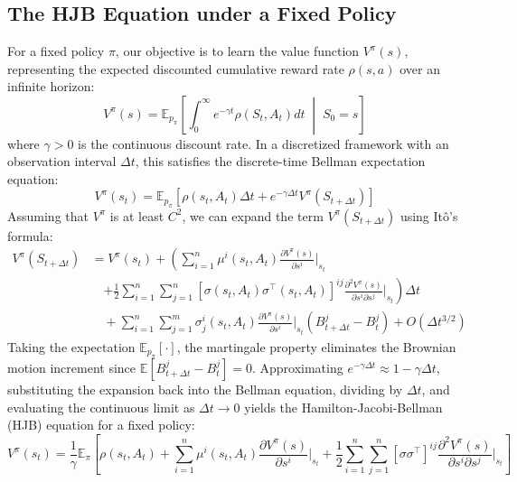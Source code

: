 \documentclass{article}
\begin{document}
\subsection{The HJB Equation under a Fixed Policy}
For a fixed policy $\pi$, our objective is to learn the value function $V^\pi(s)$, representing the expected discounted cumulative reward rate $\rho(s, a)$ over an infinite horizon:
\begin{equation}
    V^\pi(s) = \mathbb{E}_{p_\pi} \left[ \int_0^\infty e^{-\gamma t} \rho(S_t, A_t) dt \;\middle|\; S_0 = s \right]
\end{equation}
where $\gamma > 0$ is the continuous discount rate. In a discretized framework with an observation interval $\Delta t$, this satisfies the discrete-time Bellman expectation equation:
\begin{equation}
    V^\pi(s_t) = \mathbb{E}_{p_\pi} \left[ \rho(s_t, A_t)\Delta t + e^{-\gamma \Delta t} V^\pi(S_{t+\Delta t}) \right]
\end{equation}
Assuming that $V^\pi$ is at least $C^2$, we can expand the term $V^\pi(S_{t+\Delta t})$ using It\^o's formula:
\begin{align}
    V^\pi(S_{t+\Delta t}) &= V^\pi(s_t) + \left( \sum_{i=1}^n \mu^i(s_t, A_t) \frac{\partial V^\pi(s)}{\partial s^i}\Big|_{s_t} \right.\nonumber\\
    &\quad \left. + \frac{1}{2} \sum_{i=1}^n \sum_{j=1}^n \left[\sigma(s_t, A_t)\sigma^\top(s_t, A_t)\right]^{ij} \frac{\partial^2 V^\pi(s)}{\partial s^i \partial s^j}\Big|_{s_t} \right) \Delta t \nonumber\\
    &\quad + \sum_{i=1}^n \sum_{j=1}^m \sigma_j^i(s_t, A_t)\frac{\partial V^\pi(s)}{\partial s^i}\Big|_{s_t} (B^j_{t+\Delta t} - B^j_t) + O(\Delta t^{3/2})
\end{align}
Taking the expectation $\mathbb{E}_{p_\pi}[\cdot]$, the martingale property eliminates the Brownian motion increment since $\mathbb{E}[B^j_{t+\Delta t} - B^j_t] = 0$. Approximating $e^{-\gamma \Delta t} \approx 1 - \gamma \Delta t$, substituting the expansion back into the Bellman equation, dividing by $\Delta t$, and evaluating the continuous limit as $\Delta t \to 0$ yields the Hamilton-Jacobi-Bellman (HJB) equation for a fixed policy:
\begin{equation}
    V^\pi(s_t) = \frac{1}{\gamma} \mathbb{E}_{\pi} \left[ \rho(s_t, A_t) + \sum_{i=1}^n \mu^i(s_t, A_t) \frac{\partial V^\pi(s)}{\partial s^i}\Big|_{s_t} + \frac{1}{2} \sum_{i=1}^n \sum_{j=1}^n [\sigma\sigma^\top]^{ij} \frac{\partial^2 V^\pi(s)}{\partial s^i \partial s^j}\Big|_{s_t} \right]
\end{equation}
\end{document}
